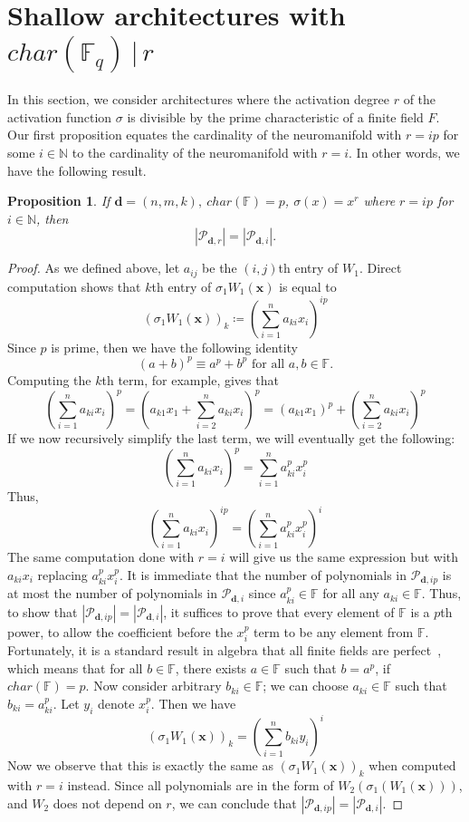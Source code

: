 \documentclass[a4paper]{cas-sc}
\newcommand{\xx}{\textbf{x}}    %
\newcommand{\dd}{\mathbf{d}}    %
\newcommand{\F}{\mathbb{F}}
\newtheorem{proposition}[theorem]{Proposition}
\begin{document}
\section{Shallow architectures with $char(\F_q)\,|\, r$}
\label{sec:shallow-p|r}
In this section, we consider architectures where the activation degree $r$ of the activation function $\sigma$ is divisible by the prime characteristic of a finite field $F$. Our first proposition equates the cardinality of the neuromanifold with $r=ip$ for some $i\in\mathbb{N}$ to the cardinality of the neuromanifold with $r=i$. In other words, we have the following result. 
\begin{proposition} 
\label{prop:architecture-M_dd_ip_eq_M_dd_i}
    If $\dd=(n,m,k),\ char(\F) = p$, $\sigma(x) = x^r$ where $r = ip$ for $i\in\mathbb{N}$, then
    \[
        |{\mathcal{P}}_{\dd,r}|=|{\mathcal{P}}_{\dd,i}|.
    \]
\end{proposition} 
\begin{proof} 
    As we defined above, let $a_{ij}$ be the $(i,j)$th entry of $W_1$. Direct computation shows that $k$th entry of $\sigma_1 W_1(\xx)$ is equal to 
    \[
        (\sigma_1 W_1(\xx))_k\coloneqq \left ( \sum_{i=1}^n a_{ki}x_i \right )^{ip}
    \]
    Since $p$ is prime, then we have the following identity
    \[
        (a+b)^p \equiv a^p+b^p\text{ for all }a,b\in\F.
    \]
    Computing the $k$th term, for example, gives that
    \[
        \left (\sum_{i=1}^n a_{ki}x_i\right)^p = \left (a_{k1}x_1 + \sum_{i=2}^n a_{ki}x_i \right)^p = (a_{k1}x_1)^p + \left (\sum_{i=2}^n a_{ki}x_i\right)^p
    \]
    If we now recursively simplify the last term, we will eventually get the following:
    \[
        \left (\sum_{i=1}^n a_{ki}x_i\right)^p = \sum_{i=1}^n a_{ki}^px_i^p
    \]
    Thus, 
    \[
        \left (\sum_{i=1}^n a_{ki}x_i  \right)^{ip} = \left (\sum_{i=1}^n a_{ki}^px_i^p\right )^i 
    \]
    The same computation done with $r = i$ will give us the same expression but with $a_{ki}x_i$ replacing $a_{ki}^px_i^p$. It is immediate that the number of polynomials in $\mathcal{P}_{\dd,ip}$ is at most the number of polynomials in $\mathcal{P}_{\dd,i}$ since $a_{ki}^p \in \F$ for all any $a_{ki} \in \F$. Thus, to show that $|\mathcal{P}_{\dd,ip}| =   |\mathcal{P}_{\dd,i}|$, it suffices to prove that every element of $\F$ is a $p$th power, to allow the coefficient before the $x_i^{p}$ term to be any element from $\F$. Fortunately, it is a standard result in algebra that all finite fields are perfect~\citep[Theorem~3]{CONRAD1995}, which means that for all $b \in \F$, there exists $a\in \F$ such that $b = a^p$, if $char(\F) = p$. Now consider arbitrary $b_{ki} \in \F$; we can choose $a_{ki} \in \F$ such that $b_{ki} = a_{ki}^p$. Let $y_i$ denote $x_i^p$. Then we have
     \[
     (\sigma_1 W_1(\xx))_k = \left (\sum_{i=1}^n b_{ki}y_i\right )^i 
     \]
     Now we observe that this is exactly the same as $(\sigma_1 W_1(\xx))_k$ when computed with $r = i$ instead. Since all polynomials are in the form of $W_2(\sigma_1(W_1(\xx)))$, and $W_2$ does not depend on $r$, we can conclude that $|\mathcal{P}_{\dd,ip}| =   |\mathcal{P}_{\dd,i}|$.
\end{proof}
\end{document}
